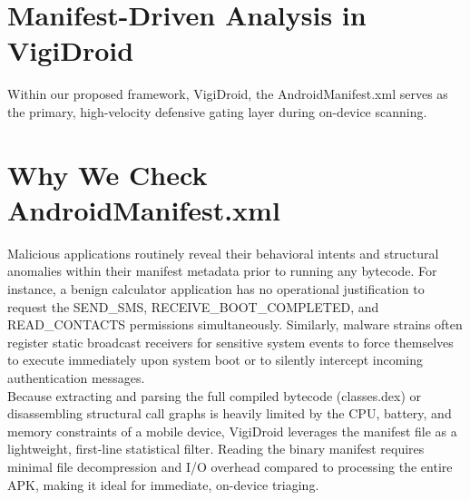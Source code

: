 \section{Manifest-Driven Analysis in VigiDroid}
Within our proposed framework, VigiDroid, the AndroidManifest.xml serves as the primary, high-velocity defensive gating layer during on-device scanning.

\section{Why We Check AndroidManifest.xml}
Malicious applications routinely reveal their behavioral intents and structural anomalies within their manifest metadata prior to running any bytecode. For instance, a benign calculator application has no operational justification to request the SEND_SMS, RECEIVE\_BOOT\_COMPLETED, and READ\_CONTACTS permissions simultaneously. Similarly, malware strains often register static broadcast receivers for sensitive system events to force themselves to execute immediately upon system boot or to silently intercept incoming authentication messages.\\

Because extracting and parsing the full compiled bytecode (classes.dex) or disassembling structural call graphs is heavily limited by the CPU, battery, and memory constraints of a mobile device, VigiDroid leverages the manifest file as a lightweight, first-line statistical filter. Reading the binary manifest requires minimal file decompression and I/O overhead compared to processing the entire APK, making it ideal for immediate, on-device triaging.

